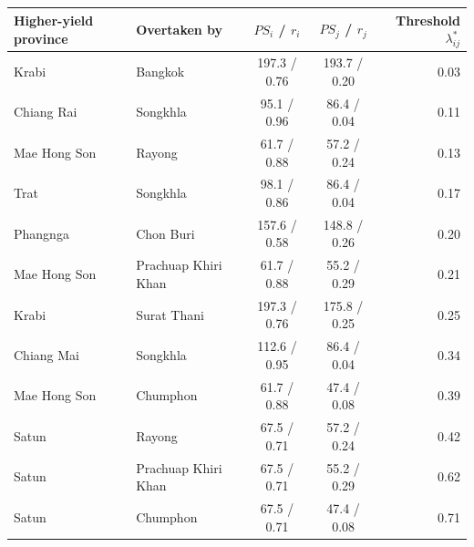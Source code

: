 \begin{tabular}{llccr}
\toprule
Higher-yield province & Overtaken by & $PS_i$ / $r_i$ & $PS_j$ / $r_j$ & Threshold $\lambda^{*}_{ij}$ \\
\midrule
Krabi & Bangkok & 197.3 / 0.76 & 193.7 / 0.20 & 0.03 \\
Chiang Rai & Songkhla & 95.1 / 0.96 & 86.4 / 0.04 & 0.11 \\
Mae Hong Son & Rayong & 61.7 / 0.88 & 57.2 / 0.24 & 0.13 \\
Trat & Songkhla & 98.1 / 0.86 & 86.4 / 0.04 & 0.17 \\
Phangnga & Chon Buri & 157.6 / 0.58 & 148.8 / 0.26 & 0.20 \\
Mae Hong Son & Prachuap Khiri Khan & 61.7 / 0.88 & 55.2 / 0.29 & 0.21 \\
Krabi & Surat Thani & 197.3 / 0.76 & 175.8 / 0.25 & 0.25 \\
Chiang Mai & Songkhla & 112.6 / 0.95 & 86.4 / 0.04 & 0.34 \\
Mae Hong Son & Chumphon & 61.7 / 0.88 & 47.4 / 0.08 & 0.39 \\
Satun & Rayong & 67.5 / 0.71 & 57.2 / 0.24 & 0.42 \\
Satun & Prachuap Khiri Khan & 67.5 / 0.71 & 55.2 / 0.29 & 0.62 \\
Satun & Chumphon & 67.5 / 0.71 & 47.4 / 0.08 & 0.71 \\
\bottomrule
\end{tabular}
